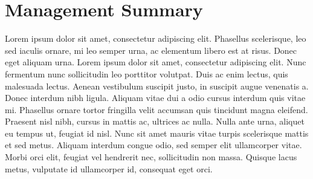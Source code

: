 
\chapter*{Management Summary}
\label{chap:managementSummary}

Lorem ipsum dolor sit amet, consectetur adipiscing elit. Phasellus scelerisque, leo sed iaculis ornare, mi leo semper urna, ac elementum libero est at risus. Donec eget aliquam urna. Lorem ipsum dolor sit amet, consectetur adipiscing elit. Nunc fermentum nunc sollicitudin leo porttitor volutpat. Duis ac enim lectus, quis malesuada lectus. Aenean vestibulum suscipit justo, in suscipit augue venenatis a. Donec interdum nibh ligula. Aliquam vitae dui a odio cursus interdum quis vitae mi. Phasellus ornare tortor fringilla velit accumsan quis tincidunt magna eleifend. Praesent nisl nibh, cursus in mattis ac, ultrices ac nulla. Nulla ante urna, aliquet eu tempus ut, feugiat id nisl. Nunc sit amet mauris vitae turpis scelerisque mattis et sed metus. Aliquam interdum congue odio, sed semper elit ullamcorper vitae. Morbi orci elit, feugiat vel hendrerit nec, sollicitudin non massa. Quisque lacus metus, vulputate id ullamcorper id, consequat eget orci.
